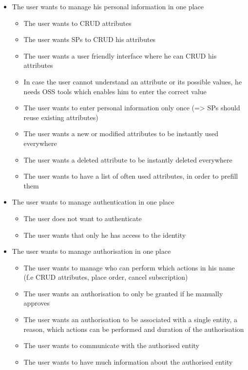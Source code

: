 \documentclass[
     12pt,         %
     a4paper,      %
     BCOR=10mm,version=first,     %
     DIV=14,version=first,        %
     ]{scrreprt}
\begin{document}
\begin{itemize}
    \item The user wants to manage his personal information in one place
    \begin{itemize}
        \item The user wants to CRUD attributes
        \item The user wants SPs to CRUD his attributes
        \item The user wants a user friendly interface where he can CRUD his attributes
        \item In case the user cannot understand an attribute or its possible values, he needs OSS tools which enables him to enter the correct value
        \item The user wants to enter personal information only once (=> SPs should reuse existing attributes)
        \item The user wants a new or modified attributes to be instantly used everywhere
        \item The user wants a deleted attribute to be instantly deleted everywhere
        \item The user wants to have a list of often used attributes, in order to prefill them
    \end{itemize}
    \item The user wants to manage authentication in one place
    \begin{itemize}
        \item The user does not want to authenticate
        \item The user wants that only he has access to the identity
    \end{itemize}
    \item The user wants to manage authorisation in one place
    \begin{itemize}
        \item The user wants to manage who can perform which actions in his name (f.e CRUD attributes, place order, cancel subscription)
        \item The user wants an authorisation to only be granted if he manually approves
        \item The user wants an authorisation to be associated with a single entity, a reason, which actions can be performed and duration of the authorisation
        \item The user wants to communicate with the authorised entity
        \item The user wants to have much information about the authorised entity

\end{itemize}
\end{itemize}
\end{document}
